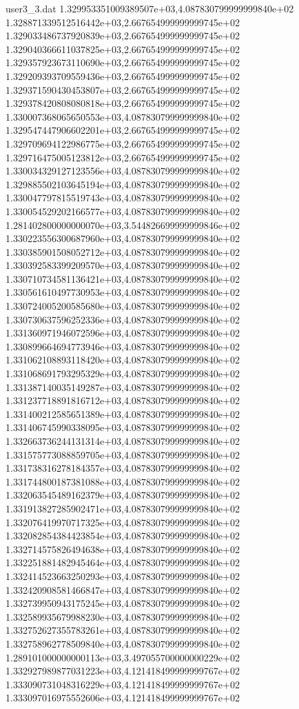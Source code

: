 \begin{filecontents}{user3_3.dat}
1.329953351009389507e+03,4.087830799999999840e+02
1.328871339512516442e+03,2.667654999999999745e+02
1.329033486737920839e+03,2.667654999999999745e+02
1.329040366611037825e+03,2.667654999999999745e+02
1.329357923673110690e+03,2.667654999999999745e+02
1.329209393709559436e+03,2.667654999999999745e+02
1.329371590430453807e+03,2.667654999999999745e+02
1.329378420808080818e+03,2.667654999999999745e+02
1.330007368065650553e+03,4.087830799999999840e+02
1.329547447906602201e+03,2.667654999999999745e+02
1.329709694122986775e+03,2.667654999999999745e+02
1.329716475005123812e+03,2.667654999999999745e+02
1.330034329127123556e+03,4.087830799999999840e+02
1.329885502103645194e+03,4.087830799999999840e+02
1.330047797815519743e+03,4.087830799999999840e+02
1.330054529202166577e+03,4.087830799999999840e+02
1.281402800000000070e+03,3.544826699999999846e+02
1.330223556300687960e+03,4.087830799999999840e+02
1.330385901508052712e+03,4.087830799999999840e+02
1.330392583399209570e+03,4.087830799999999840e+02
1.330710734581136421e+03,4.087830799999999840e+02
1.330561610497730953e+03,4.087830799999999840e+02
1.330724005200585680e+03,4.087830799999999840e+02
1.330730637596252336e+03,4.087830799999999840e+02
1.331360971946072596e+03,4.087830799999999840e+02
1.330899664694773946e+03,4.087830799999999840e+02
1.331062108893118420e+03,4.087830799999999840e+02
1.331068691793295329e+03,4.087830799999999840e+02
1.331387140035149287e+03,4.087830799999999840e+02
1.331237718891816712e+03,4.087830799999999840e+02
1.331400212585651389e+03,4.087830799999999840e+02
1.331406745990338095e+03,4.087830799999999840e+02
1.332663736244131314e+03,4.087830799999999840e+02
1.331575773088859705e+03,4.087830799999999840e+02
1.331738316278184357e+03,4.087830799999999840e+02
1.331744800187381088e+03,4.087830799999999840e+02
1.332063545489162379e+03,4.087830799999999840e+02
1.331913827285902471e+03,4.087830799999999840e+02
1.332076419970717325e+03,4.087830799999999840e+02
1.332082854384423854e+03,4.087830799999999840e+02
1.332714575826494638e+03,4.087830799999999840e+02
1.332251881482945464e+03,4.087830799999999840e+02
1.332414523663250293e+03,4.087830799999999840e+02
1.332420908581466847e+03,4.087830799999999840e+02
1.332739950943175245e+03,4.087830799999999840e+02
1.332589935679988230e+03,4.087830799999999840e+02
1.332752627355783261e+03,4.087830799999999840e+02
1.332758962778509840e+03,4.087830799999999840e+02
1.289101000000000113e+03,3.497055700000000229e+02
1.332927989877031223e+03,4.121418499999999767e+02
1.333090731048316229e+03,4.121418499999999767e+02
1.333097016975552606e+03,4.121418499999999767e+02

\end{filecontents}
